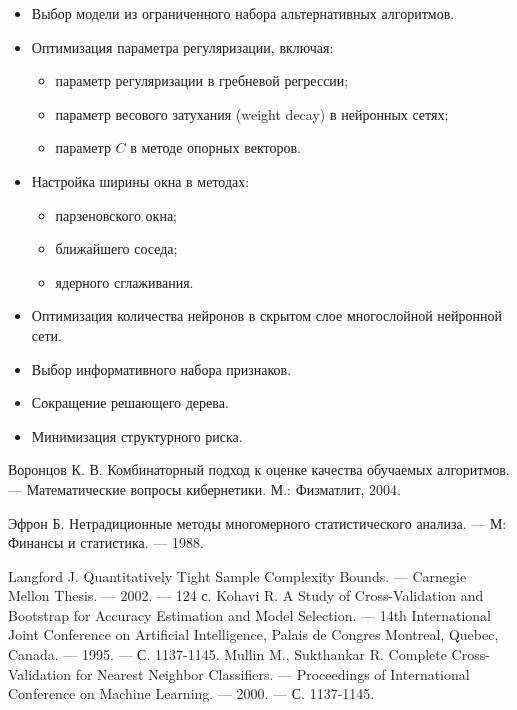\begin{itemize}
    \item Выбор модели из ограниченного набора альтернативных алгоритмов.
    \item Оптимизация параметра регуляризации, включая:
    \begin{itemize}
        \item параметр регуляризации в гребневой регрессии;
        \item параметр весового затухания (weight decay) в нейронных сетях;
        \item параметр \( C \) в методе опорных векторов.
    \end{itemize}
    \item Настройка ширины окна в методах:
    \begin{itemize}
        \item парзеновского окна;
        \item ближайшего соседа;
        \item ядерного сглаживания.
    \end{itemize}
    \item Оптимизация количества нейронов в скрытом слое многослойной нейронной сети.
    \item Выбор информативного набора признаков.
    \item Сокращение решающего дерева.
    \item Минимизация структурного риска.
\end{itemize}

\begin{thebibliography}{5}

Воронцов К. В. Комбинаторный подход к оценке качества обучаемых алгоритмов. — Математические вопросы кибернетики. М.: Физматлит, 2004.

Эфрон Б. Нетрадиционные методы многомерного статистического анализа. — М: Финансы и статистика. — 1988.

Langford J. Quantitatively Tight Sample Complexity Bounds. — Carnegie Mellon Thesis. — 2002. — 124 с.
Kohavi R. A Study of Cross-Validation and Bootstrap for Accuracy Estimation and Model Selection. — 14th International Joint Conference on Artificial Intelligence, Palais de Congres Montreal, Quebec, Canada. — 1995. — С. 1137-1145.
Mullin M., Sukthankar R. Complete Cross-Validation for Nearest Neighbor Classifiers. — Proceedings of International Conference on Machine Learning. — 2000. — С. 1137-1145.

\end{thebibliography}

